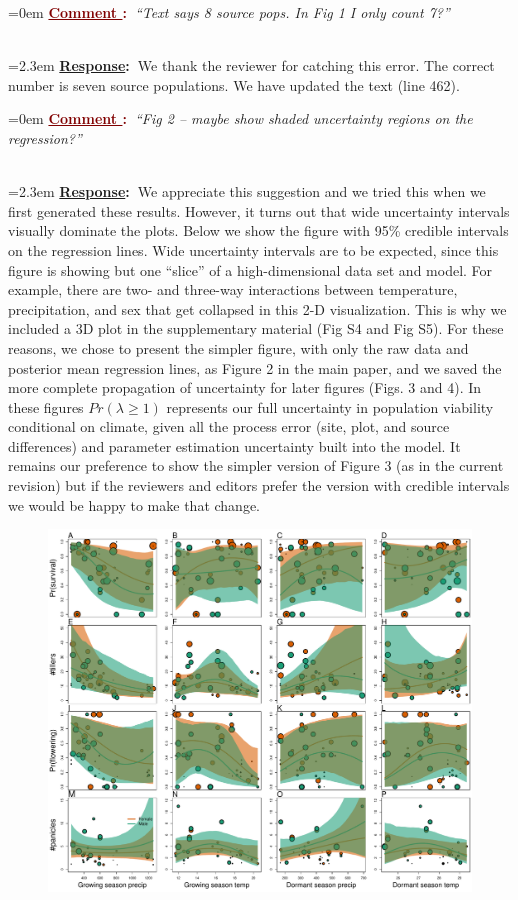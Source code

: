 \documentclass[12pt]{article}
\newcounter{cN}
\newcommand{\comment}[1]{
	\vspace{2em}
	\refstepcounter{cN} %
	\noindent \hangindent=0em \textbf{\textcolor{Maroon}{\uline{Comment \thecN}:~}}\emph{``#1''}
	}
\newcommand{\response}[1]{
	\\[0.25em]
	\hangindent=2.3em \textbf{\textcolor{NavyBlue}{\uline{Response}:~}}#1
	}
\begin{document}
\comment{Text says 8 source pops. In Fig 1 I only count 7?}
\response{We thank the reviewer for catching this error. 
The correct number is seven source populations. 
We have updated the text (line 462).}

\comment{Fig 2 – maybe show shaded uncertainty regions on the regression?}
\response{We appreciate this suggestion and we tried this when we first generated these results. However, it turns out that wide uncertainty intervals visually dominate the plots. 
Below we show the figure with 95\% credible intervals on the regression lines.
Wide uncertainty intervals are to be expected, since this figure is showing but one ``slice'' of a high-dimensional data set and model. 
For example, there are two- and three-way interactions between temperature, precipitation, and sex that get collapsed in this 2-D visualization. 
This is why we included a 3D plot in the supplementary material (Fig S4 and Fig  S5).
For these reasons, we chose to present the simpler figure, with only the raw data and posterior mean regression lines, as Figure 2 in the main paper, and we saved the more complete propagation of uncertainty for later figures (Figs. 3 and 4).
In these figures $Pr(\lambda \ge 1)$ represents our full uncertainty in population viability conditional on climate, given all the process error (site, plot, and source differences) and parameter estimation uncertainty built into the model. 
It remains our preference to show the simpler version of Figure 3 (as in the current revision) but if the reviewers and editors prefer the version with credible intervals we would be happy to make that change. 

\begin{figure}[h!]
	\centering
	\includegraphics[width=1\linewidth]{../../Figures/vital_rates_v1_r1.pdf}
	\label{fig:vital_rates}
\end{figure}
}
\end{document}
